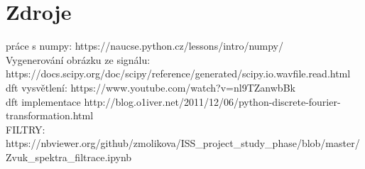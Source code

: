 \documentclass[a4paper, 11pt]{article}
\begin{document}





\newpage
\section{Zdroje}
práce s numpy: https://naucse.python.cz/lessons/intro/numpy/ \\
Vygenerování obrázku ze signálu: https://docs.scipy.org/doc/scipy/reference/generated/scipy.io.wavfile.read.html \\
dft vysvětlení: https://www.youtube.com/watch?v=nl9TZanwbBk \\
dft implementace http://blog.o1iver.net/2011/12/06/python-discrete-fourier-transformation.html \\
FILTRY: https://nbviewer.org/github/zmolikova/ISS\_project\_study\_phase/blob/master/Zvuk\_spektra\_filtrace.ipynb
\end{document}
